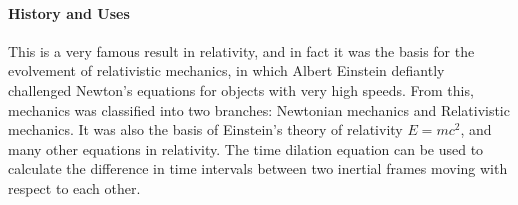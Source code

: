 \documentclass[12pt]{article}
\begin{document}
\paragraph{History and Uses}
This is a very famous result in relativity, and in fact it was the basis for the evolvement of relativistic mechanics, in which Albert Einstein defiantly challenged Newton's equations for objects with very high speeds. From this, mechanics was classified into two branches: Newtonian mechanics and Relativistic mechanics. It was also the basis of Einstein's theory of relativity $E=mc^2$, and many other equations in relativity. The time dilation equation can be used to calculate the difference in time intervals between two inertial frames moving with respect to each other.


\end{document}
